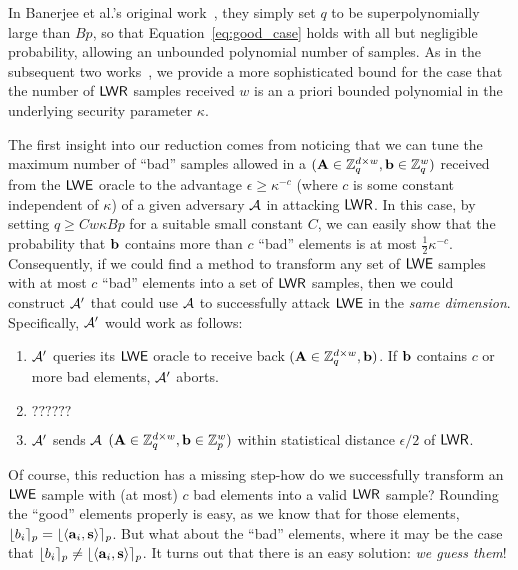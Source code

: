 In Banerjee et al.'s original
work~\cite{DBLP:conf/eurocrypt/BanerjeePR12}, they simply set $q$ to be superpolynomially large
than $Bp$, so that Equation~\ref{eq:good_case} holds with all but negligible
probability, allowing an unbounded polynomial number of samples. As in
the subsequent two works~\cite{DBLP:conf/crypto/AlwenKPW13,DBLP:conf/tcc/BogdanovGMRR16}, we provide a more
sophisticated bound for the case that the number of $\mathsf{LWR}$ samples
received $w$ is an a priori bounded polynomial in the underlying
security parameter $\kappa$. 

The first insight into our reduction comes from noticing that we can
tune the maximum number of ``bad'' samples allowed in a $(\mathbf{A} \in
\mathbb{Z}_q^{d \times w}, \mathbf{b} \in \mathbb{Z}_q^w)$ received from the $\mathsf{LWE}$ oracle
to the advantage
$\epsilon \geq \kappa^{-c}$ (where $c$ is some constant independent
  of $\kappa$) of a given adversary $\mathcal{A}$ in attacking $\mathsf{LWR}$. In
  this case, by setting $q \geq Cw\kappa Bp$ for a suitable small
  constant $C$, we can easily show that the probability that $\mathbf{b}$
  contains more than $c$ ``bad'' elements is at most
  $\tfrac{1}{2}\kappa^{-c}$. Consequently, if we could find a method to
  transform any set of $\mathsf{LWE}$ samples with at most $c$ ``bad'' elements into
  a set of $\mathsf{LWR}$ samples, then we could construct $\mathcal{A}'$ that could use
  $\mathcal{A}$ to successfully attack $\mathsf{LWE}$ in the \emph{same
    dimension}. Specifically, $\mathcal{A}'$ would work as follows:

\begin{enumerate}
\item $\mathcal{A}'$ queries its $\mathsf{LWE}$ oracle to receive back $(\mathbf{A} \in
  \mathbb{Z}_q^{d \times w},
  \mathbf{b})$. If $\mathbf{b}$ contains $c$ or more bad elements, $\mathcal{A}'$
  aborts. 
\item $??????$
\item $\mathcal{A}'$ sends $\mathcal{A}$ $(\mathbf{A} \in \mathbb{Z}_q^{d \times w},\mathbf{b}
  \in \mathbb{Z}_p^{w})$ within statistical distance $\epsilon/2$ of $\mathsf{LWR}$.
\end{enumerate}

Of course, this reduction has a missing step-how do we successfully
transform an $\mathsf{LWE}$ sample with (at most) $c$ bad elements into a
valid $\mathsf{LWR}$ sample? Rounding the ``good'' elements properly is easy,
as we know that for those elements,
$\lfloor b_i\rceil_p=\lfloor\langle\mathbf{a}_i,\mathbf{s}\rangle\rceil_p$. But what about the ``bad''
elements, where it may be the case that $\lfloor b_i\rceil_p \neq
\lfloor\langle\mathbf{a}_i,\mathbf{s}\rangle\rceil_p$. It turns out that there is an
easy solution: \emph{we guess them}!

